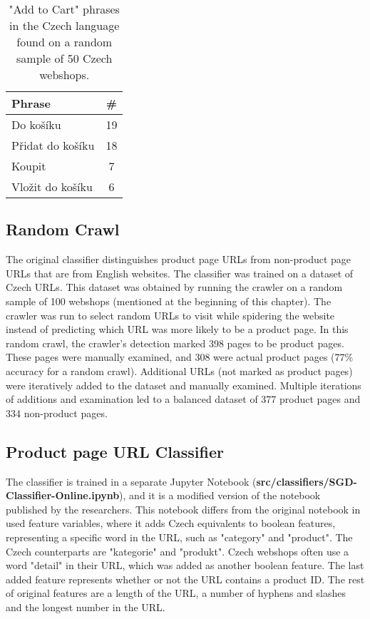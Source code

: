         \begin{table}[h!]
            \centering
            \begin{tabular}{l | c} 
            \textbf{Phrase} & \textbf{\#} \\ [0.5ex] 
            \hline
            Do košíku & 19 \\ \hline
            Přidat do košíku & 18 \\ \hline
            Koupit & 7 \\ \hline
            Vložit do košíku & 6 \\ [1ex] 
            \end{tabular}
            \caption{"Add to Cart" phrases in the Czech language found on a random sample of 50 Czech webshops.}
            \label{table:add-to-cart-phrases}
        \end{table}

        \subsection{Random Crawl}

        The original classifier distinguishes product page URLs from non-product page URLs that are from English websites. The classifier was trained on a dataset of Czech URLs. This dataset was obtained by running the crawler on a random sample of 100 webshops (mentioned at the beginning of this chapter). The crawler was run to select random URLs to visit while spidering the website instead of predicting which URL was more likely to be a product page. In this random crawl, the crawler's detection marked 398 pages to be product pages. These pages were manually examined, and 308 were actual product pages (77\% accuracy for a random crawl). Additional URLs (not marked as product pages) were iteratively added to the dataset and manually examined. Multiple iterations of additions and examination led to a balanced dataset of 377 product pages and 334 non-product pages.

        \subsection{Product page URL Classifier}

        The classifier is trained in a separate Jupyter Notebook (\textbf{src/classifiers/SGD-Classifier-Online.ipynb}), and it is a modified version of the notebook published by the researchers. This notebook differs from the original notebook in used feature variables, where it adds Czech equivalents to boolean features, representing a specific word in the URL, such as "category" and "product". The Czech counterparts are "kategorie" and "produkt". Czech webshops often use a word "detail" in their URL, which was added as another boolean feature. The last added feature represents whether or not the URL contains a product ID. The rest of original features are a length of the URL, a number of hyphens and slashes and the longest number in the URL. 


